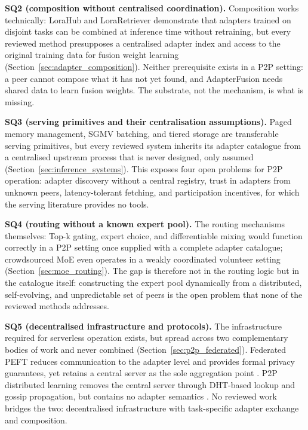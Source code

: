 \noindent\textbf{SQ2 (composition without centralised coordination).}
Composition works technically: LoraHub and LoraRetriever
demonstrate that adapters trained on disjoint tasks can be combined at
inference time without retraining, but every reviewed method presupposes a
centralised adapter index and access to the original training data for fusion
weight learning (Section~\ref{sec:adapter_composition}). Neither prerequisite
exists in a P2P setting: a peer cannot compose what it has not yet found, and
AdapterFusion \cite{Pfeiffer2021fusion} needs shared data to learn fusion
weights. The substrate, not the mechanism, is what is missing.

\noindent\textbf{SQ3 (serving primitives and their centralisation
assumptions).} Paged memory management, SGMV batching, and tiered storage are
transferable serving primitives, but every reviewed system inherits its
adapter catalogue from a centralised upstream process that is never designed,
only assumed (Section~\ref{sec:inference_systems}). This exposes four open
problems for P2P operation: adapter discovery without a central registry,
trust in adapters from unknown peers, latency-tolerant fetching, and
participation incentives, for which the serving literature provides no tools.

\noindent\textbf{SQ4 (routing without a known expert pool).} The routing
mechanisms themselves: Top-k gating, expert choice, and differentiable
mixing would function correctly in a P2P setting once supplied with a
complete adapter catalogue; crowdsourced MoE even operates in a weakly
coordinated volunteer setting \cite{RyabininCrowdsourced2020}
(Section~\ref{sec:moe_routing}). The gap is therefore not in the routing logic
but in the catalogue itself: constructing the expert pool dynamically from a
distributed, self-evolving, and unpredictable set of peers is the open problem
that none of the reviewed methods addresses.

\noindent\textbf{SQ5 (decentralised infrastructure and protocols).} The
infrastructure required for serverless operation exists, but spread across two
complementary bodies of work and never combined (Section~\ref{sec:p2p_federated}).
Federated PEFT reduces communication to the adapter level and provides formal
privacy guarantees, yet retains a central server as the sole aggregation point
\cite{McMahan2017, ZhangFedPETuning2023}. P2P distributed learning removes the
central server through DHT-based lookup and gossip propagation, but contains no
adapter semantics \cite{MaymounkovKademlia2002, OrmandyGossip2013}. No reviewed
work bridges the two: decentralised infrastructure with task-specific adapter
exchange and composition.


